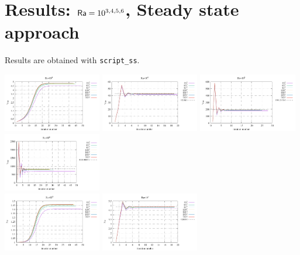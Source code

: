 \newpage
\section*{Results: ${\mathsf{Ra}}=10^{3,4,5,6}$, Steady state approach}

Results are obtained with {\tt script\_ss}. 

\begin{center}
\includegraphics[width=4.297cm]{python_codes/fieldstone_155/results_SS/vrms_Ra1e3}
\includegraphics[width=4.297cm]{python_codes/fieldstone_155/results_SS/vrms_Ra1e4}
\includegraphics[width=4.297cm]{python_codes/fieldstone_155/results_SS/vrms_Ra1e5}
\includegraphics[width=4.297cm]{python_codes/fieldstone_155/results_SS/vrms_Ra1e6}\\
\includegraphics[width=4.297cm]{python_codes/fieldstone_155/results_SS/Nu_Ra1e3}
\includegraphics[width=4.297cm]{python_codes/fieldstone_155/results_SS/Nu_Ra1e4}

\end{center}
